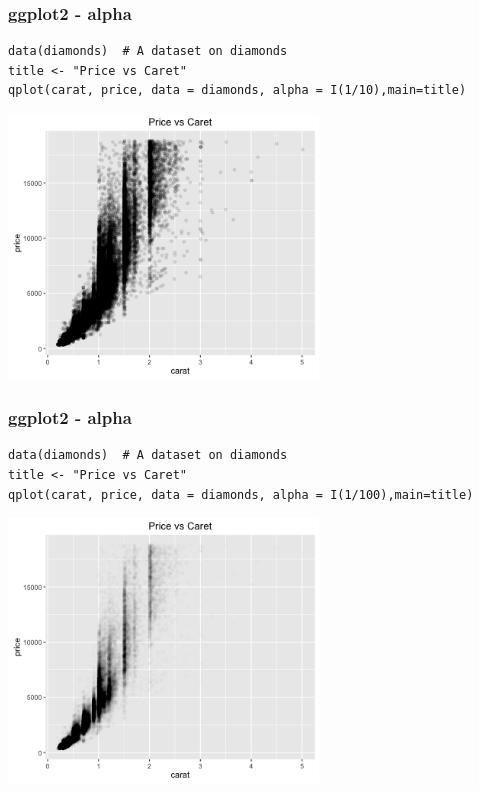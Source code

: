 \documentclass{beamer}
\begin{document}
\begin{frame}[fragile]
\frametitle{ggplot2 - alpha}
\scriptsize
\begin{verbatim}
data(diamonds)  # A dataset on diamonds
title <- "Price vs Caret"
qplot(carat, price, data = diamonds, alpha = I(1/10),main=title)
\end{verbatim}
\begin{center}
\includegraphics[height=7cm]{../IMG/qplot_alpha.png}
\end{center}
\end{frame}


%

\begin{frame}[fragile]
\frametitle{ggplot2 - alpha}
\scriptsize
\begin{verbatim}
data(diamonds)  # A dataset on diamonds
title <- "Price vs Caret"
qplot(carat, price, data = diamonds, alpha = I(1/100),main=title)
\end{verbatim}
\begin{center}
\includegraphics[height=7cm]{../IMG/qplot_dia2.png}
\end{center}
\end{frame}

\end{document}
